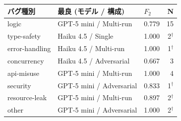 \begin{tabular}{@{}lllr@{}}
\toprule
バグ種別 & 最良 (モデル / 構成) & $F_2$ & N \\
\midrule
logic & GPT-5 mini / Multi-run & 0.779 & 15 \\
type-safety & Haiku 4.5 / Single & 1.000 & 2$^{\dagger}$ \\
error-handling & Haiku 4.5 / Multi-run & 1.000 & 1$^{\dagger}$ \\
concurrency & Haiku 4.5 / Adversarial & 0.667 & 3 \\
api-misuse & GPT-5 mini / Multi-run & 1.000 & 4 \\
security & GPT-5 mini / Adversarial & 0.833 & 1$^{\dagger}$ \\
resource-leak & GPT-5 mini / Multi-run & 0.897 & 2$^{\dagger}$ \\
other & GPT-5 mini / Adversarial & 1.000 & 2$^{\dagger}$ \\
\bottomrule
\end{tabular}
